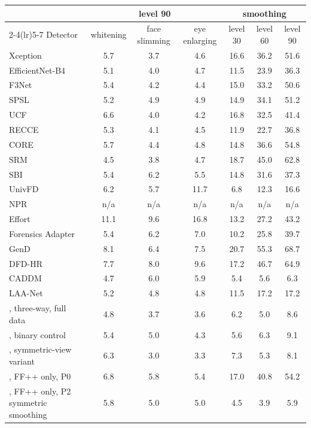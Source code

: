 \begin{tabular}{@{}l ccc ccc@{}}
\toprule
 & \multicolumn{3}{c}{level 90} & \multicolumn{3}{c}{smoothing} \\
\cmidrule(lr){2-4}\cmidrule(lr){5-7}
Detector & whitening & face slimming & eye enlarging & level 30 & level 60 & level 90 \\
\midrule
Xception & 5.7 & 3.7 & 4.6 & 16.6 & 36.2 & 51.6 \\
EfficientNet-B4 & 5.1 & 4.0 & 4.7 & 11.5 & 23.9 & 36.3 \\
F3Net & 5.4 & 4.2 & 4.4 & 15.0 & 33.2 & 50.6 \\
SPSL & 5.2 & 4.9 & 4.9 & 14.9 & 34.1 & 51.2 \\
UCF & 6.6 & 4.0 & 4.2 & 16.8 & 32.5 & 41.4 \\
RECCE & 5.3 & 4.1 & 4.5 & 11.9 & 22.7 & 36.8 \\
CORE & 5.7 & 4.4 & 4.8 & 14.8 & 36.6 & 54.8 \\
SRM & 4.5 & 3.8 & 4.7 & 18.7 & 45.0 & 62.8 \\
SBI~\cite{sbi} & 5.4 & 6.2 & 5.5 & 14.8 & 31.6 & 37.3 \\
UnivFD & 6.2 & 5.7 & 11.7 & 6.8 & 12.3 & 16.6 \\
NPR & n/a & n/a & n/a & n/a & n/a & n/a \\
Effort~\cite{effort} & 11.1 & 9.6 & 16.8 & 13.2 & 27.2 & 43.2 \\
Forensics Adapter~\cite{forensicsadapter} & 5.4 & 6.2 & 7.0 & 10.2 & 25.8 & 39.7 \\
GenD~\cite{gend2026} & 8.1 & 6.4 & 7.5 & 20.7 & 55.3 & 68.7 \\
DFD-HR~\cite{dfdhr2026} & 7.7 & 8.0 & 9.6 & 17.2 & 46.7 & 64.9 \\
CADDM~\cite{caddm} & 4.7 & 6.0 & 5.9 & 5.4 & 5.6 & 6.3 \\
LAA-Net~\cite{laanet} & 5.2 & 4.8 & 4.8 & 11.5 & 17.2 & 17.2 \\
\midrule
\ours{}, three-way, full data & 4.8 & 3.7 & 3.6 & 6.2 & 5.0 & 8.6 \\
\ours{}, binary control & 5.4 & 5.0 & 4.3 & 5.6 & 6.3 & 9.1 \\
\ours{}, symmetric-view variant & 6.3 & 3.0 & 3.3 & 7.3 & 5.3 & 8.1 \\
\ours{}, FF++ only, P0 & 6.8 & 5.8 & 5.4 & 17.0 & 40.8 & 54.2 \\
\ours{}, FF++ only, P2 symmetric smoothing & 5.8 & 5.0 & 5.0 & 4.5 & 3.9 & 5.9 \\
\bottomrule
\end{tabular}
